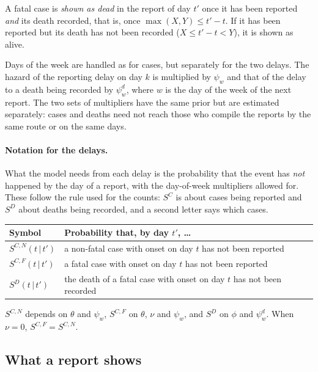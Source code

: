 \documentclass[11pt,a4paper]{article}
\newcommand{\given}{\,|\,}
\begin{document}
A fatal case is \emph{shown as dead} in the report of day $t'$ once it has
been reported \emph{and} its death recorded, that is, once
$\max(X,Y)\le t'-t$. If it has been reported but its death has not been
recorded ($X\le t'-t<Y$), it is shown as alive.

Days of the week are handled as for cases, but separately for the two
delays. The hazard of the reporting delay on day $k$ is multiplied by
$\psi_w$ and that of the delay to a death being recorded by $\psi^{d}_w$,
where $w$ is the day of the week of the next report. The two sets of
multipliers have the same prior but are estimated
separately: cases and deaths need not reach those who compile the reports by
the same route or on the same days.

\paragraph{Notation for the delays.} What the model needs from each delay
is the probability that the event has \emph{not} happened by the day of a
report, with the day-of-week multipliers allowed for. These follow the rule
used for the counts: $S^{C}$ is about cases being reported and $S^{D}$ about
deaths being recorded, and a second letter says which cases.
\begin{center}
\begin{tabular}{ll}
\toprule
Symbol & Probability that, by day $t'$, \ldots \\
\midrule
$S^{C,N}(t\given t')$ & a non-fatal case with onset on day $t$ has not been reported \\
$S^{C,F}(t\given t')$ & a fatal case with onset on day $t$ has not been reported \\
$S^{D}(t\given t')$ & the death of a fatal case with onset on day $t$ has not been recorded \\
\bottomrule
\end{tabular}
\end{center}
$S^{C,N}$ depends on $\theta$ and $\psi_w$, $S^{C,F}$ on $\theta$, $\nu$
and $\psi_w$, and $S^{D}$ on $\phi$ and $\psi^{d}_w$. When $\nu=0$,
$S^{C,F}=S^{C,N}$.

\subsection{What a report shows}
\end{document}
